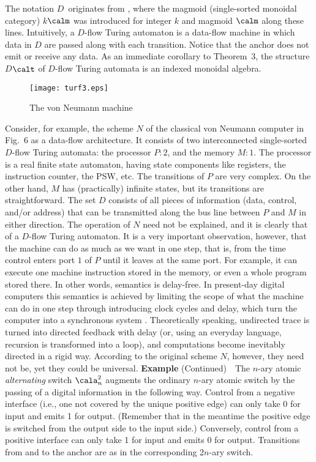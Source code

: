 \documentclass{eptcs}
\begin{document}
  The notation $D$\dil\ originates from \cite{arnold}, where the magmoid
(single-sorted monoidal category) $k$\dil $\calm $ was introduced for integer
$k$ and magmoid $\calm $ along these lines. Intuitively, a $D$-flow Turing
automaton is a data-flow machine in which data in $D$ are passed along with
each transition. Notice that the anchor does not emit or receive any data. As
an immediate corollary to Theorem~3, the structure $D$\dil $\calt $ of
$D$-flow Turing automata is an indexed monoidal algebra. 
\begin{figure}[h]
\begin{center}
\texttt{[image: turf3.eps]}
\end{center}
\vspmini
\caption{The von Neumann machine}
\vspmini
\end{figure}


Consider, for
example, the scheme $N$ of the classical von Neumann computer in Fig.~6 as a data-flow
architecture. It consists of two interconnected single-sorted $D$-flow Turing automata: 
the processor $P:2$, and the memory $M:1$. The processor is a real finite state
automaton, having state components like registers, the instruction counter, the PSW, etc. 
The transitions of $P$ are very complex. On the other hand, $M$ has (practically) infinite states, 
but its transitions are straightforward. The set $D$ consists of all pieces of 
information (data, control, and/or address) that can be transmitted along the bus
line between $P$ and $M$ in either direction. The operation of $N$ need not be explained, 
and it is clearly that of a $D$-flow Turing automaton. It is a very
important observation, however, that the machine can do as much as we want in one
step, that is, from the time control enters port $1$ of $P$ until it leaves at
the same port. For example, it can execute one machine instruction stored in the
memory, or even a whole program stored there. In other words, semantics
is delay-free. In present-day digital computers this semantics is achieved by limiting
the scope of what the machine can do in one step through introducing clock
cycles and delay, which turn the computer into a synchronous system \cite{tcs}.
Theoretically speaking, undirected trace is turned into directed feedback with
delay (or, using an everyday language, recursion is transformed into a loop),
and  computations become inevitably directed in a rigid way. According to the original
scheme $N$, however, they need not be, yet they could be universal.
\vspp\newline
{\bf Example} (Continued)\ \ The $n$-ary atomic {\em alternating\/} switch 
$\cala ^2_n$ augments 
the ordinary $n$-ary atomic switch by the passing of a digital information in the following
way. Control from a negative interface (i.e., one not covered by the unique positive edge)
can only take 0 for input and emits 1 for output. (Remember that in the meantime the
positive edge is switched from the output side to the input side.) Conversely, control
from a positive interface can only take 1 for input and emits 0 for output. 
Transitions from and to the anchor are as in the corresponding $2n$-ary switch.
\end{document}
